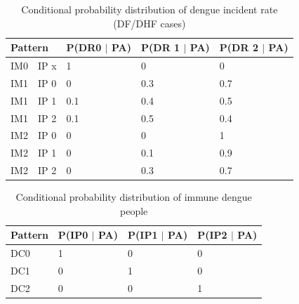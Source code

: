 \documentclass[review]{elsarticle}
\begin{document}
	\begin{table}[!htbp]
		\centering
		\normalsize
		\begin{tabular}{|l|l|l|l|l|}
			\hline
			\multicolumn{2}{|l|}{Pattern}   & P(DR0 $\mid$  PA) & P(DR 1 $\mid$  PA) & P(DR 2 $\mid$  PA)\\
			\hline
			IM0 & IP x & 1 & 0 & 0\\
			\hline
			IM1 & IP 0 & 0 & 0.3 & 0.7\\
			\hline
			IM1 & IP 1 & 0.1 & 0.4 & 0.5\\
			\hline
			IM1 & IP 2 & 0.1 & 0.5 & 0.4\\
			\hline
			IM2 & IP 0 & 0 & 0 & 1\\
			\hline
			IM2 & IP 1 & 0 & 0.1 & 0.9\\
			\hline
			IM2 & IP 2 & 0 & 0.3 & 0.7\\
			\hline
		\end{tabular}
		\caption{Conditional probability distribution of dengue incident rate (DF/DHF cases)}
	\end{table}
	
	\begin{table}[!htbp]
		\centering
		\normalsize
		\begin{tabular}{|l|l|l|l|}
			\hline
			Pattern & P(IP0 $\mid$ PA) & P(IP1 $\mid$ PA) & P(IP2 $\mid$ PA)\\
			\hline
			DC0 & 1 & 0 & 0\\
			\hline
			DC1 & 0 & 1 & 0\\
			\hline
			DC2 & 0 & 0 & 1\\
			\hline
		\end{tabular}
		\caption{Conditional probability distribution of immune dengue people}
	\end{table}
	
\end{document}
